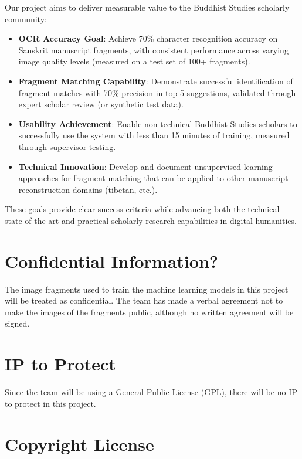 \documentclass{article}
\begin{document}
Our project aims to deliver measurable value to the Buddhist Studies scholarly community:

\begin{itemize}
\item \textbf{OCR Accuracy Goal}: Achieve 70\% character recognition accuracy on Sanskrit manuscript fragments, with consistent performance across varying image quality levels (measured on a test set of 100+ fragments).

\item \textbf{Fragment Matching Capability}: Demonstrate successful identification of fragment matches with 70\% precision in top-5 suggestions, validated through expert scholar review (or synthetic test data).

\item \textbf{Usability Achievement}: Enable non-technical Buddhist Studies scholars to successfully use the system with less than 15 minutes of training, measured through supervisor testing.

\item \textbf{Technical Innovation}: Develop and document unsupervised learning approaches for fragment matching that can be applied to other manuscript reconstruction domains (tibetan, etc.).
\end{itemize}

These goals provide clear success criteria while advancing both the technical state-of-the-art and practical scholarly research capabilities in digital humanities.

\section{Confidential Information?}

The image fragments used to train the machine learning models in this project will be treated as confidential. The team has made a verbal agreement not to make the images of the fragments public, although no written agreement will be signed.

\section{IP to Protect}


Since the team will be using a General Public License (GPL), there will be no IP to protect in this project.
\section{Copyright License}
\end{document}
